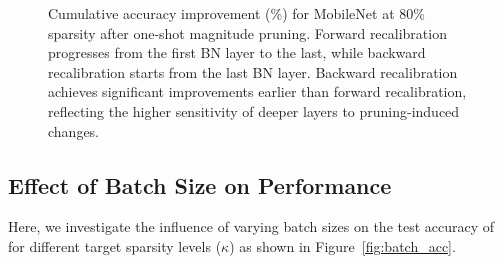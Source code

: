 \begin{figure}[t]
\caption{Cumulative accuracy improvement (\%) for MobileNet at 80\% sparsity after one-shot magnitude pruning. Forward recalibration progresses from the first BN layer to the last, while backward recalibration starts from the last BN layer. Backward recalibration achieves significant improvements earlier than forward recalibration, reflecting the higher sensitivity of deeper layers to pruning-induced changes.}\label{fig:layerwise_recovery}
\end{figure}






\subsection{Effect of Batch Size on Performance}\label{sec:Ablation_batch}

Here, we investigate the influence of varying batch sizes on the test accuracy of \REFLOW{} for different target sparsity levels (\(\kappa\)) as shown in Figure~\ref{fig:batch_acc}. 


